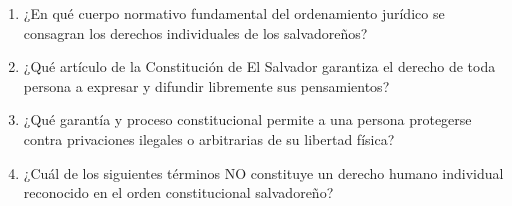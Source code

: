 \documentclass[10pt,a4paper]{article}
\begin{document}
\begin{enumerate}[label=\textbf{\arabic*.}]
\vspace{0.15cm}
\item ¿En qué cuerpo normativo fundamental del ordenamiento jurídico se consagran los derechos individuales de los salvadoreños?
\begin{enumerate}[label=\textbf{\Alph*)}]
\end{enumerate}
\vspace{0.15cm}
\item ¿Qué artículo de la Constitución de El Salvador garantiza el derecho de toda persona a expresar y difundir libremente sus pensamientos?
\begin{enumerate}[label=\textbf{\Alph*)}]
\end{enumerate}
\vspace{0.15cm}
\item ¿Qué garantía y proceso constitucional permite a una persona protegerse contra privaciones ilegales o arbitrarias de su libertad física?
\begin{enumerate}[label=\textbf{\Alph*)}]
\end{enumerate}
\vspace{0.15cm}
\item ¿Cuál de los siguientes términos NO constituye un derecho humano individual reconocido en el orden constitucional salvadoreño?
\begin{enumerate}[label=\textbf{\Alph*)}]

\end{enumerate}
\end{enumerate}
\end{document}
